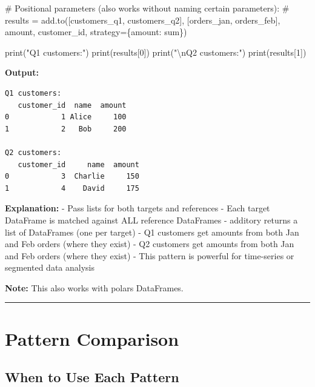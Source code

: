 \documentclass[
  letterpaper,
]{scrbook}
\newenvironment{Shaded}{\begin{snugshade}}{\end{snugshade}}
\newcommand{\BuiltInTok}[1]{\textcolor[rgb]{0.00,0.23,0.31}{#1}}
\newcommand{\CharTok}[1]{\textcolor[rgb]{0.13,0.47,0.30}{#1}}
\newcommand{\CommentTok}[1]{\textcolor[rgb]{0.37,0.37,0.37}{#1}}
\newcommand{\DecValTok}[1]{\textcolor[rgb]{0.68,0.00,0.00}{#1}}
\newcommand{\NormalTok}[1]{\textcolor[rgb]{0.00,0.23,0.31}{#1}}
\newcommand{\StringTok}[1]{\textcolor[rgb]{0.13,0.47,0.30}{#1}}
\begin{document}
\begin{Shaded}
\begin{Highlighting}[]
\CommentTok{\# Positional parameters (also works without naming certain parameters):}
\CommentTok{\# results = add.to([customers\_q1, customers\_q2], [orders\_jan, orders\_feb], \textquotesingle{}amount\textquotesingle{}, \textquotesingle{}customer\_id\textquotesingle{}, strategy=\{\textquotesingle{}amount\textquotesingle{}: \textquotesingle{}sum\textquotesingle{}\})}

\BuiltInTok{print}\NormalTok{(}\StringTok{"Q1 customers:"}\NormalTok{)}
\BuiltInTok{print}\NormalTok{(results[}\DecValTok{0}\NormalTok{])}
\BuiltInTok{print}\NormalTok{(}\StringTok{"}\CharTok{\textbackslash{}n}\StringTok{Q2 customers:"}\NormalTok{)}
\BuiltInTok{print}\NormalTok{(results[}\DecValTok{1}\NormalTok{])}
\end{Highlighting}
\end{Shaded}

\textbf{Output:}

\begin{verbatim}
Q1 customers:
   customer_id  name  amount
0            1 Alice     100
1            2   Bob     200

Q2 customers:
   customer_id     name  amount
0            3  Charlie     150
1            4    David     175
\end{verbatim}

\textbf{Explanation:} - Pass lists for both targets and references -
Each target DataFrame is matched against ALL reference DataFrames -
additory returns a list of DataFrames (one per target) - Q1 customers
get amounts from both Jan and Feb orders (where they exist) - Q2
customers get amounts from both Jan and Feb orders (where they exist) -
This pattern is powerful for time-series or segmented data analysis

\textbf{Note:} This also works with polars DataFrames.

\begin{center}\rule{0.5\linewidth}{0.5pt}\end{center}

\section{Pattern Comparison}\label{pattern-comparison}

\subsection{When to Use Each Pattern}\label{when-to-use-each-pattern}
\end{document}
